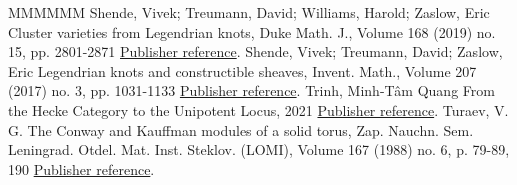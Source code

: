 \documentclass[11pt]{article}
\theoremstyle{definition}
\numberwithin{equation}{section}
\begin{document}
\begin{thebibliography}{MMMMMM}
 Shende, Vivek; Treumann, David; Williams, Harold; Zaslow, Eric Cluster varieties from Legendrian knots, Duke Math. J., Volume 168 (2019) no. 15, pp. 2801-2871 \href{https://alco.centre-mersenne.org/articles/10.5802/alco.345/#STWZ}{Publisher reference}.
 Shende, Vivek; Treumann, David; Zaslow, Eric Legendrian knots and constructible sheaves, Invent. Math., Volume 207 (2017) no. 3, pp. 1031-1133 \href{https://alco.centre-mersenne.org/articles/10.5802/alco.345/#STZ}{Publisher reference}.
 Trinh, Minh-Tâm Quang From the Hecke Category to the Unipotent Locus, 2021 \href{https://alco.centre-mersenne.org/articles/10.5802/alco.345/#Trinh}{Publisher reference}.
 Turaev, V. G. The Conway and Kauffman modules of a solid torus, Zap. Nauchn. Sem. Leningrad. Otdel. Mat. Inst. Steklov. (LOMI), Volume 167 (1988) no. 6, p. 79-89, 190 \href{https://alco.centre-mersenne.org/articles/10.5802/alco.345/#Turaev}{Publisher reference}.
\end{thebibliography}
\end{document}
